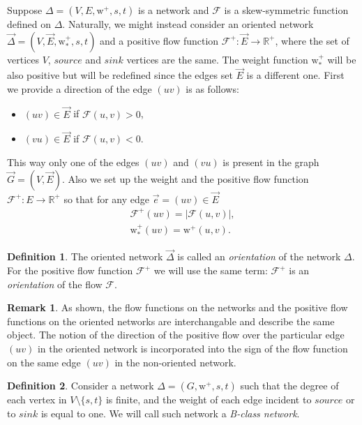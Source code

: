 \documentclass[12pt]{article}
\theoremstyle{definition}
\newtheorem{remark}{Remark}
\newtheorem{definition}{Definition}
\newcommand{\wtp}{\mathrm{w}^{+}}
\newcommand{\flow}{\mathcal{F}}
\newcommand{\flowpos}{\mathcal{F}^{+}}
\newcommand{\source}{\mathit{source}}
\newcommand{\sink}{\mathit{sink}}
\newcommand{\net}{\Delta}
\newcommand{\onet}{\vec{\Delta}}
\numberwithin{remark}{section}
\numberwithin{theorem}{section}
\numberwithin{prop}{section}
\numberwithin{equation}{section}
\numberwithin{lemma}{section}
\numberwithin{prop_under_lemma}{lemma}
\begin{document}
    Suppose $\net = (V, E, \wtp, s, t)$ is a network and $\flow$ is a skew-symmetric function defined
    on $\net$.
    Naturally, we might instead consider an oriented network $\onet = (V, \vec{E}, \wtp_{*}, s, t)$ and a 
      positive flow function $\flowpos: \vec{E} \to \mathbb{R}^{+}$, where
      the set of vertices $V$, $\source$ and $\sink$ vertices are the same.
    The weight function $\wtp_{*}$ will be also positive but will be redefined since the edges set $\vec{E}$ is a different one.
    First we provide a direction of the edge $(uv)$ is as follows:
    \begin{itemize}
      \item $(uv) \in \vec{E}$ if $\flow(u, v) > 0$,
      \item $(vu) \in \vec{E}$ if $\flow(u, v) < 0$.
    \end{itemize}
    This way only one of the edges $(uv)$ and $(vu)$ is present in the graph $\vec{G} = (V, \vec{E})$.
    Also we set up the weight and the positive flow function $\flowpos: E \to \mathbb{R}^{+}$ so that
    for any edge $\vec{e} = (uv) \in \vec{E}$
    \begin{align*}
      \flowpos(uv) = |\flow(u,v)|,\\
      \wtp_{*}(uv) = \wtp(u,v).
    \end{align*}
    \begin{definition}
      The oriented network $\onet$ is called an \emph{orientation} of the network $\net$.
      For the positive flow function $\flowpos$ we will use the same term:
        $\flowpos$ is an \emph{orientation} of the flow $\flow$.
    \end{definition}
    \begin{remark}
      As shown, the flow functions on the networks and the positive flow functions on the oriented networks
        are interchangable and describe the same object.
      The notion of the direction of the positive flow over the particular edge $(uv)$ in the oriented network
        is incorporated into the sign of the flow function on the same edge $(uv)$ in the non-oriented network.
    \end{remark}
    \begin{definition}
      Consider a network $\net = (G, \wtp, s, t)$ such that
        the degree of each vertex in $V \setminus \{s, t\} $ is finite,
        and the weight of each edge incident to $\source$ or to $\sink$ is equal to one.
      We will call such network a \emph{B-class network}.
    \end{definition}
    
\end{document}
